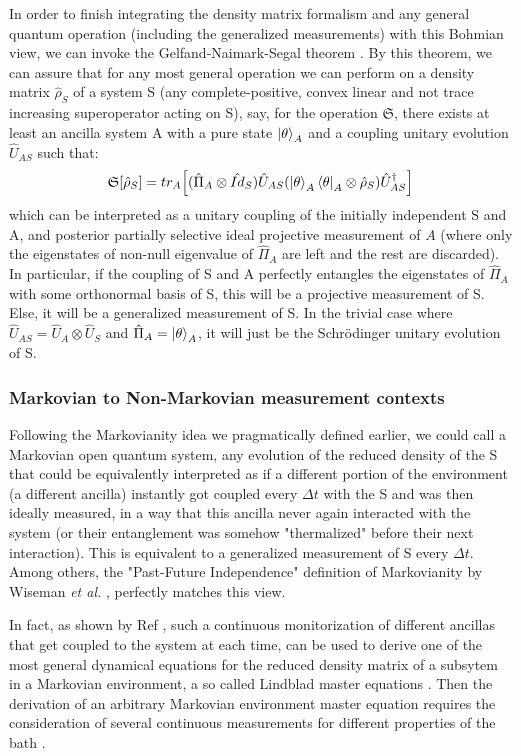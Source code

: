 \documentclass[11pt, a4paper]{article} %
\begin{document}
In order to finish integrating the density matrix formalism and any general quantum operation (including the generalized measurements) with this Bohmian view, we can invoke the Gelfand-Naimark-Segal theorem \cite{GNSTheorem, Generalized}. By this theorem, we can assure that for any most general operation we can perform on a density matrix $\hat{\rho}_S$ of a system S (any complete-positive, convex linear and not trace increasing superoperator acting on S), say, for the operation $\mathfrak{S}$, there exists at least an ancilla system A with a pure state $\ket{\theta}_A$ and a coupling unitary evolution $\hat{U}_{AS}$ such that:
\begin{equation}
\mathfrak{S}[\hat{\rho}_S]=tr_A\qty[ (\hat{\Pi}_A\otimes \hat{Id}_S)  \hat{U}_{AS}\qty(\ket{\theta}_A\bra{\theta}_A\otimes \hat{\rho}_S)\hat{U}_{AS}^\dagger]
\end{equation}
which can be interpreted as a unitary coupling of the initially independent S and A, and posterior partially selective ideal projective measurement of $A$ (where only the eigenstates of non-null eigenvalue of $\hat{\Pi}_A$ are left and the rest are discarded). In particular, if the coupling of S and A perfectly entangles the eigenstates of $\hat{\Pi}_A$ with some orthonormal basis of S, this will be a projective measurement of S. Else, it will be a generalized measurement of S. In the trivial case where $\hat{U}_{AS}=\hat{U}_A\otimes\hat{U}_S$ and $\hat{\Pi}_A=\ket{\theta}_A$, it will just be the Schrödinger unitary evolution of S.


\subsubsection*{Markovian to Non-Markovian measurement contexts}
Following the Markovianity idea we pragmatically defined earlier, we could call a Markovian open quantum system, any evolution of the reduced density of the S that could be equivalently interpreted as if a different portion of the environment (a different ancilla) instantly got coupled every $\Delta t$ with the S and was then ideally measured, in a way that this ancilla never again interacted with the system (or their entanglement was somehow "thermalized" before their next interaction). This is equivalent to a generalized measurement of S every $\Delta t$. Among others, the "Past-Future Independence" definition of Markovianity by Wiseman {\em et al.} \cite{MarkovianityDefs}, perfectly matches this view.

In fact, as shown by Ref \cite{continousMeas}, such a continuous monitorization of different ancillas that get coupled to the system at each time, can be used to derive one of the most general dynamical equations for the reduced density matrix of a subsytem in a Markovian environment, a so called Lindblad master equations \cite{Generalized, MarkovianityDefs}. Then the derivation of an arbitrary Markovian environment master equation requires the consideration of several continuous measurements for different properties of the bath \cite{continousMeas, MarkovianityDefs}.
\end{document}
